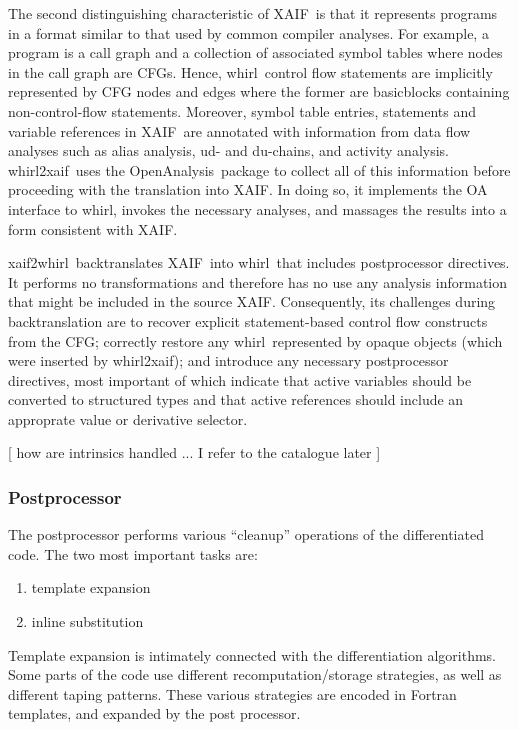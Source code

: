 \documentclass[11pt]{article}
\newcommand{\basicblock}{basicblock}
\newcommand{\OpenAnalysis}{OpenAnalysis}
\newcommand{\xaif}{XAIF}
\newcommand{\whirl}{whirl}
\newcommand{\whirlToxaif}{whirl2xaif}
\newcommand{\xaifTowhirl}{xaif2whirl}
\begin{document}
The second distinguishing characteristic of \xaif\ is that it
represents programs in a format similar to that used by common
compiler analyses.  For example, a program is a call graph and a
collection of associated symbol tables where nodes in the call graph
are CFGs.  Hence, \whirl\ control flow statements are implicitly
represented by CFG nodes and edges where the former are {\basicblock}s
containing non-control-flow statements.  Moreover, symbol table
entries, statements and variable references in \xaif\ are annotated
with information from data flow analyses such as alias analysis, ud-
and du-chains, and activity analysis.  \whirlToxaif\ uses the
\OpenAnalysis\ package to collect all of this information before
proceeding with the translation into \xaif.  In doing so, it
implements the OA interface to \whirl, invokes the necessary analyses,
and massages the results into a form consistent with \xaif.

\xaifTowhirl\ backtranslates \xaif\ into \whirl\ that includes
postprocessor directives.  It performs no transformations and
therefore has no use any analysis information that might be included
in the source \xaif.  Consequently, its challenges during
backtranslation are to recover explicit statement-based control flow
constructs from the CFG; correctly restore any \whirl\ represented by
opaque objects (which were inserted by \whirlToxaif); and introduce
any necessary postprocessor directives, most important of which
indicate that active variables should be converted to structured types
and that active references should include an approprate value or
derivative selector.

{\color{red} [ how are intrinsics handled ... I refer to the catalogue later  ] }



\subsubsection{Postprocessor}
The postprocessor performs various ``cleanup'' operations of the
differentiated code. The two most important tasks are:
   \begin{enumerate}
      \item template expansion
      \item inline substitution
   \end{enumerate}

Template expansion is intimately connected with the differentiation
algorithms. Some parts of the code use different recomputation/storage
strategies, as well as different taping patterns. These various
strategies are encoded in Fortran templates, and expanded by the
post processor.
\end{document}
